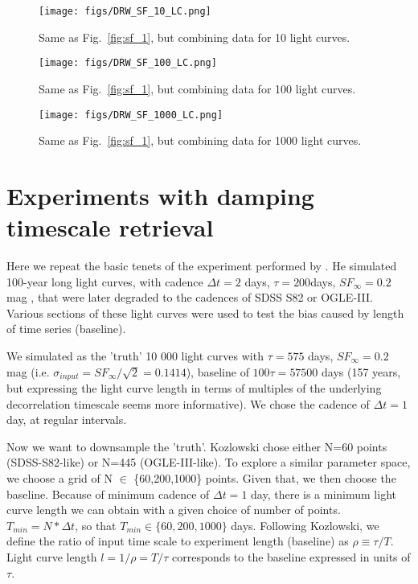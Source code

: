 \documentclass[fleqn,usenatbib]{mnras}  %
\begin{document}
\begin{figure}
\texttt{[image: figs/DRW\_SF\_10\_LC.png]}
\caption{Same as Fig.~\ref{fig:sf_1}, but combining data for 10 light curves.}
\label{fig:sf_10}
\end{figure}

\begin{figure}
\texttt{[image: figs/DRW\_SF\_100\_LC.png]}
\caption{Same as Fig.~\ref{fig:sf_1}, but combining data for 100 light curves.}
\label{fig:sf_100}
\end{figure}


\begin{figure}
\texttt{[image: figs/DRW\_SF\_1000\_LC.png]}
\caption{Same as Fig.~\ref{fig:sf_1}, but combining data for 1000 light curves.}
\label{fig:sf_1000}
\end{figure}


\section{Experiments with damping timescale retrieval }

Here we repeat the basic tenets of the experiment performed by \citep{kozlowski2017a}. He simulated 100-year long light curves, with cadence $\Delta t= 2 $ days, $\tau = 200 $days, $SF_{\infty} = 0.2$ mag , that were later degraded to the cadences of SDSS S82 or OGLE-III. Various sections of these light curves were used to test the bias caused by length of time series (baseline). 


We simulated as the 'truth'  10 000 light curves with $\tau=575 $ days, $SF_{\infty}=0.2$ mag  (i.e.  $\sigma_{input} =SF_{\infty} /\sqrt{2} = 0.1414  $), baseline of $100 \tau = 57500$ days (157 years, but expressing the light curve length in terms of multiples of the underlying decorrelation timescale seems more informative). We chose the cadence of $\Delta t=1$ day, at regular intervals.


Now we want to downsample the 'truth'. Kozlowski chose either N=60 points (SDSS-S82-like) or N=445 (OGLE-III-like). To explore a similar parameter space, we choose a grid of N $\in$ \{60,200,1000\} points. Given that, we then choose the baseline.  Because of minimum cadence of $\Delta t = 1$ day, there is a minimum light curve length we can obtain with a given  choice of number of points.   $T_{min}= N * \Delta t$, so that $T_{min} \in \{60,200,1000\} $ days. Following Kozlowski, we define the ratio of input time scale to  experiment length (baseline) as $\rho \equiv \tau / T$. Light curve length  $l = 1 / \rho = T / \tau$ corresponds to the baseline expressed in units of $\tau$. 
\end{document}
